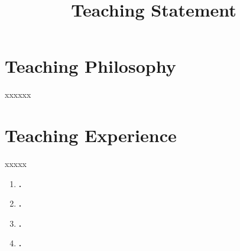 \documentclass[12pt,a4paper,sans]{moderncv} %
\title{Teaching Statement}
\begin{document}
\makecvtitle %


\section{Teaching Philosophy}
xxxxxx
\section{Teaching Experience}
xxxxx
\begin{enumerate}

\item \textbf{.} \par 
\item \textbf{.}\par 
\item \textbf{.} \par 
\item \textbf{.} \par 
\end{enumerate}
\end{document}
